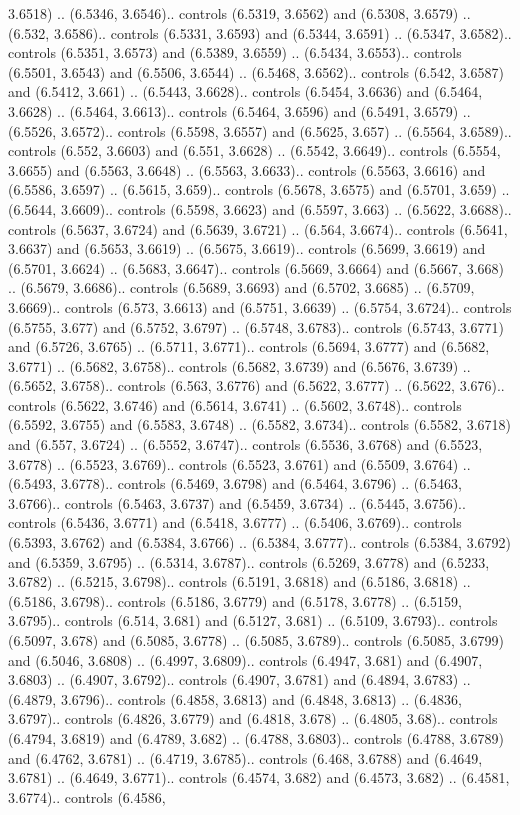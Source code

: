 3.6518) .. (6.5346, 3.6546).. controls (6.5319, 3.6562) and (6.5308, 3.6579) .. (6.532, 3.6586).. controls (6.5331, 3.6593) and (6.5344, 3.6591) .. (6.5347, 3.6582).. controls (6.5351, 3.6573) and (6.5389, 3.6559) .. (6.5434, 3.6553).. controls (6.5501, 3.6543) and (6.5506, 3.6544) .. (6.5468, 3.6562).. controls (6.542, 3.6587) and (6.5412, 3.661) .. (6.5443, 3.6628).. controls (6.5454, 3.6636) and (6.5464, 3.6628) .. (6.5464, 3.6613).. controls (6.5464, 3.6596) and (6.5491, 3.6579) .. (6.5526, 3.6572).. controls (6.5598, 3.6557) and (6.5625, 3.657) .. (6.5564, 3.6589).. controls (6.552, 3.6603) and (6.551, 3.6628) .. (6.5542, 3.6649).. controls (6.5554, 3.6655) and (6.5563, 3.6648) .. (6.5563, 3.6633).. controls (6.5563, 3.6616) and (6.5586, 3.6597) .. (6.5615, 3.659).. controls (6.5678, 3.6575) and (6.5701, 3.659) .. (6.5644, 3.6609).. controls (6.5598, 3.6623) and (6.5597, 3.663) .. (6.5622, 3.6688).. controls (6.5637, 3.6724) and (6.5639, 3.6721) .. (6.564, 3.6674).. controls (6.5641, 3.6637) and (6.5653, 3.6619) .. (6.5675, 3.6619).. controls (6.5699, 3.6619) and (6.5701, 3.6624) .. (6.5683, 3.6647).. controls (6.5669, 3.6664) and (6.5667, 3.668) .. (6.5679, 3.6686).. controls (6.5689, 3.6693) and (6.5702, 3.6685) .. (6.5709, 3.6669).. controls (6.573, 3.6613) and (6.5751, 3.6639) .. (6.5754, 3.6724).. controls (6.5755, 3.677) and (6.5752, 3.6797) .. (6.5748, 3.6783).. controls (6.5743, 3.6771) and (6.5726, 3.6765) .. (6.5711, 3.6771).. controls (6.5694, 3.6777) and (6.5682, 3.6771) .. (6.5682, 3.6758).. controls (6.5682, 3.6739) and (6.5676, 3.6739) .. (6.5652, 3.6758).. controls (6.563, 3.6776) and (6.5622, 3.6777) .. (6.5622, 3.676).. controls (6.5622, 3.6746) and (6.5614, 3.6741) .. (6.5602, 3.6748).. controls (6.5592, 3.6755) and (6.5583, 3.6748) .. (6.5582, 3.6734).. controls (6.5582, 3.6718) and (6.557, 3.6724) .. (6.5552, 3.6747).. controls (6.5536, 3.6768) and (6.5523, 3.6778) .. (6.5523, 3.6769).. controls (6.5523, 3.6761) and (6.5509, 3.6764) .. (6.5493, 3.6778).. controls (6.5469, 3.6798) and (6.5464, 3.6796) .. (6.5463, 3.6766).. controls (6.5463, 3.6737) and (6.5459, 3.6734) .. (6.5445, 3.6756).. controls (6.5436, 3.6771) and (6.5418, 3.6777) .. (6.5406, 3.6769).. controls (6.5393, 3.6762) and (6.5384, 3.6766) .. (6.5384, 3.6777).. controls (6.5384, 3.6792) and (6.5359, 3.6795) .. (6.5314, 3.6787).. controls (6.5269, 3.6778) and (6.5233, 3.6782) .. (6.5215, 3.6798).. controls (6.5191, 3.6818) and (6.5186, 3.6818) .. (6.5186, 3.6798).. controls (6.5186, 3.6779) and (6.5178, 3.6778) .. (6.5159, 3.6795).. controls (6.514, 3.681) and (6.5127, 3.681) .. (6.5109, 3.6793).. controls (6.5097, 3.678) and (6.5085, 3.6778) .. (6.5085, 3.6789).. controls (6.5085, 3.6799) and (6.5046, 3.6808) .. (6.4997, 3.6809).. controls (6.4947, 3.681) and (6.4907, 3.6803) .. (6.4907, 3.6792).. controls (6.4907, 3.6781) and (6.4894, 3.6783) .. (6.4879, 3.6796).. controls (6.4858, 3.6813) and (6.4848, 3.6813) .. (6.4836, 3.6797).. controls (6.4826, 3.6779) and (6.4818, 3.678) .. (6.4805, 3.68).. controls (6.4794, 3.6819) and (6.4789, 3.682) .. (6.4788, 3.6803).. controls (6.4788, 3.6789) and (6.4762, 3.6781) .. (6.4719, 3.6785).. controls (6.468, 3.6788) and (6.4649, 3.6781) .. (6.4649, 3.6771).. controls (6.4574, 3.682) and (6.4573, 3.682) .. (6.4581, 3.6774).. controls (6.4586, 